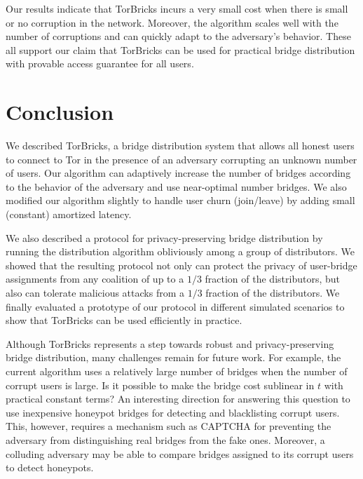 \documentclass[USenglish,oneside,twocolumn]{article}
\newcommand{\bricks}{}
\def\bricks/{\textsf{\sfsize \mbox{TorBricks}}}
\newcommand{\sfsize}{\fontsize{0.68\baselineskip}{0.68\baselineskip}\selectfont}
\begin{document}
Our results indicate that \bricks/ incurs a very small cost when there is small or no corruption in the network. Moreover, the algorithm scales well with the number of corruptions and can quickly adapt to the adversary's behavior. These all support our claim that \bricks/ can be used for practical bridge distribution with provable access guarantee for all users.

\section{Conclusion} \label{sec:conclusion}
We described \bricks/, a bridge distribution system that allows all honest users to connect to Tor in the presence of an adversary corrupting an unknown number of users. Our algorithm can adaptively increase the number of bridges according to the behavior of the adversary and use near-optimal number bridges. We also modified our algorithm slightly to handle user churn (join/leave) by adding small (constant) amortized latency.

We also described a protocol for privacy-preserving bridge distribution by running the distribution algorithm obliviously among a group of distributors. We showed that the resulting protocol not only can protect the privacy of user-bridge assignments from any coalition of up to a $1/3$ fraction of the distributors, but also can tolerate malicious attacks from a $1/3$ fraction of the distributors. We finally evaluated a prototype of our protocol in different simulated scenarios to show that \bricks/ can be used efficiently in practice.

Although \bricks/ represents a step towards robust and privacy-preserving bridge distribution, many challenges remain for future work. For example, the current algorithm uses a relatively large number of bridges when the number of corrupt users is large. Is it possible to make the bridge cost sublinear in $t$ with practical constant terms? 
An interesting direction for answering this question to use inexpensive honeypot bridges for detecting and blacklisting corrupt users. This, however, requires a mechanism such as CAPTCHA for preventing the adversary from distinguishing real bridges from the fake ones. Moreover, a colluding adversary may be able to compare bridges assigned to its corrupt users to detect honeypots.
\end{document}
